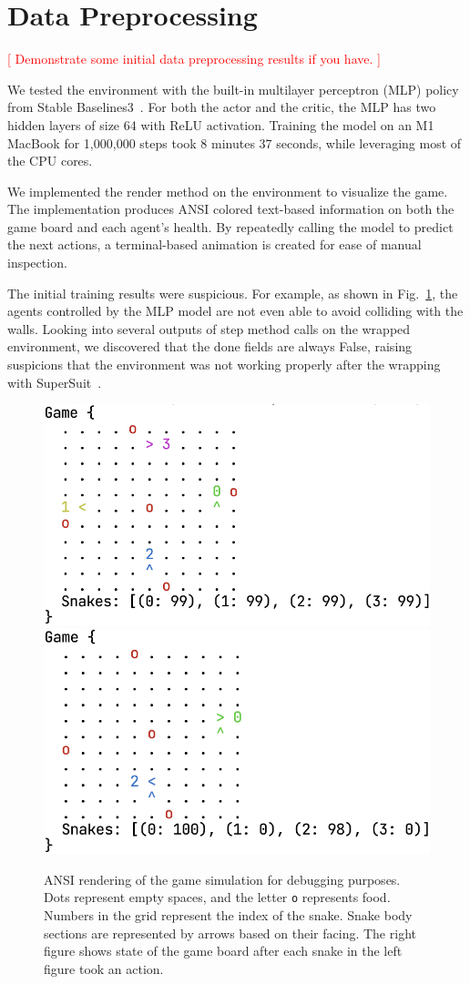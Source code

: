 \documentclass[a4paper]{article}
\newcommand{\todo}[1]{\textcolor{red}{[ #1 ]}}
\begin{document}
\section{Data Preprocessing}

\todo{Demonstrate some initial data preprocessing results if you have.}

We tested the environment with the built-in multilayer perceptron (MLP)
policy from Stable Baselines3~\cite{raffin2024stable}.
For both the actor and the critic,
the MLP has two hidden layers of size 64 with ReLU activation.
Training the model on an M1 MacBook for 1,000,000 steps took 8 minutes 37
seconds, while leveraging most of the CPU cores.

We implemented the \textsf{render} method on the environment to visualize the game.
The implementation produces ANSI colored text-based information on both the game
board and each agent's health.
By repeatedly calling the model to predict the next actions,
a terminal-based animation is created for ease of manual inspection.

The initial training results were suspicious. For example,
as shown in Fig.~\ref{fig:render},
the agents controlled by the MLP model are not even able to avoid colliding with
the walls. Looking into several outputs of \textsf{step}
method calls on the wrapped environment, we discovered that the \textsf{done}
fields are always \textsf{False}, raising suspicions that the environment was
not working properly after the wrapping with SuperSuit~\cite{SuperSuit}.

\begin{figure}
    \centering
    \includegraphics[width=0.4\linewidth]{game_render_eg.png}\quad
    \includegraphics[width=0.4\linewidth]{game_render_eg1.png}
    \caption{ANSI rendering of the game simulation for debugging purposes.
        Dots represent empty spaces, and the letter \texttt{o} represents food.
        Numbers in the grid represent the index of the snake.
        Snake body sections are represented by arrows based on their facing.
        The right figure shows state of the game board after each snake in the
        left figure took an action.
    }
    \label{fig:render}
\end{figure}
\end{document}
